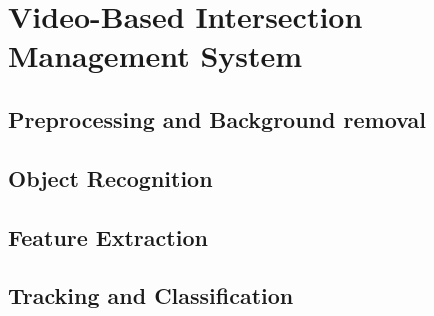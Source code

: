 \chapter [Video-Based System]{Video-Based Intersection Management System}

\section{Preprocessing and Background removal}
\section{Object Recognition}
\section{Feature Extraction}
\section{Tracking and Classification}